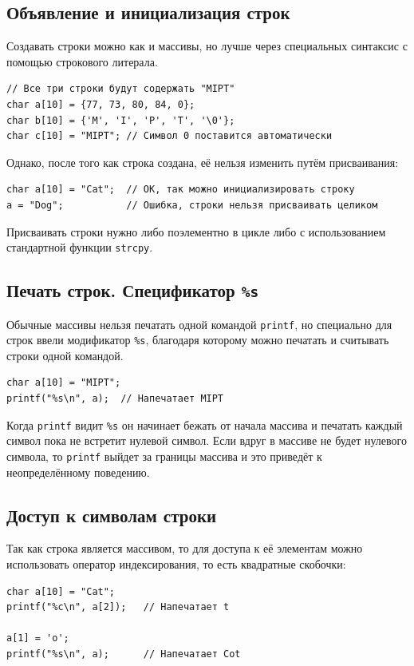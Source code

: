 \documentclass[10pt]{article}
\begin{document}
\subsection*{Объявление и инициализация строк}
Создавать строки можно как и массивы, но лучше через специальных синтаксис с помощью строкового литерала. 
\begin{lstlisting}
// Все три строки будут содержать "MIPT"  
char a[10] = {77, 73, 80, 84, 0};
char b[10] = {'M', 'I', 'P', 'T', '\0'};
char c[10] = "MIPT"; // Символ 0 поставится автоматически
\end{lstlisting}
Однако, после того как строка создана, её нельзя изменить путём присваивания:
\begin{lstlisting}
char a[10] = "Cat";  // OK, так можно инициализировать строку
a = "Dog";			 // Ошибка, строки нельзя присваивать целиком
\end{lstlisting}
Присваивать строки нужно либо поэлементно в цикле либо с использованием стандартной функции \texttt{strcpy}.


\subsection*{Печать строк. Спецификатор \texttt{\%s}}
Обычные массивы нельзя печатать одной командой \texttt{printf}, но специально для строк ввели модификатор \texttt{\%s}, благодаря которому можно печатать и считывать строки одной командой.
\begin{lstlisting}
char a[10] = "MIPT";
printf("%s\n", a);  // Напечатает MIPT
\end{lstlisting}
Когда \texttt{printf} видит \texttt{\%s} он начинает бежать от начала массива и печатать каждый символ пока не встретит нулевой символ. Если вдруг в массиве не будет нулевого символа, то \texttt{printf} выйдет за границы массива и это приведёт к неопределённому поведению.

\subsection*{Доступ к символам строки}
Так как строка является массивом, то для доступа к её элементам можно использовать оператор индексирования, то есть квадратные скобочки:
\begin{lstlisting}
char a[10] = "Cat";
printf("%c\n", a[2]);  	// Напечатает t

a[1] = 'o';	
printf("%s\n", a);		// Напечатает Cot
\end{lstlisting}
\end{document}
